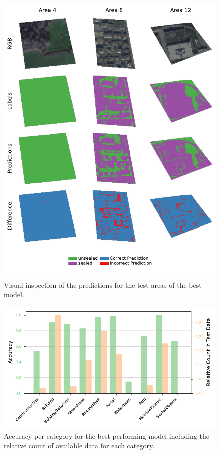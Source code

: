 \begin{figure}[H]
    \centering
    \captionsetup{width=0.8\linewidth}
    \includegraphics{figures/best_model_visual.pdf}
    \caption{Visual inspection of the predictions for the test areas of the best model.}
    \label{fig:best_model_visual}
\end{figure}

\begin{figure}[H]
    \centering
    \captionsetup{width=0.8\linewidth}
    \includegraphics{figures/best_model_accuracy_per_category.pdf}
    \caption{Accuracy per category for the best-performing model including the relative count of available data for each category.}
    \label{fig:best_model_accuracy_per_category}
\end{figure}

